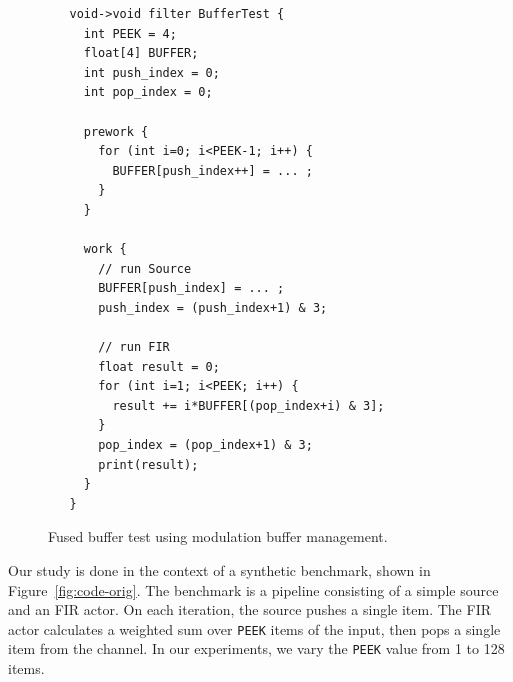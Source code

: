 \documentclass{sigplanconf}
\begin{document}
\begin{figure}[t]

\centering
{\small
\begin{verbatim}
   void->void filter BufferTest {       
     int PEEK = 4;                      
     float[4] BUFFER;                   
     int push_index = 0;                
     int pop_index = 0;                 
                                        
     prework {                          
       for (int i=0; i<PEEK-1; i++) {   
         BUFFER[push_index++] = ... ;
       }                                
     }                                  
                                        
     work {                             
       // run Source                    
       BUFFER[push_index] = ... ;
       push_index = (push_index+1) & 3;              
                                        
       // run FIR                       
       float result = 0;                
       for (int i=1; i<PEEK; i++) {     
         result += i*BUFFER[(pop_index+i) & 3];    
       }                                
       pop_index = (pop_index+1) & 3;     
       print(result);                   
     }                                  
   }                                    
\end{verbatim}}
\vspace{-6pt}

\caption{Fused buffer test using modulation buffer management.\protect\label{fig:code-modulation}}
\end{figure}


Our study is done in the context of a synthetic benchmark, shown in
Figure~\ref{fig:code-orig}.  
The benchmark is a pipeline consisting of a simple source and an FIR
actor.  On each iteration, the source pushes a single item.  The FIR
actor calculates a weighted sum over {\tt PEEK} items of the input,
then pops a single item from the channel.  In our experiments, we vary
the {\tt PEEK} value from 1 to 128 items.
\end{document}
